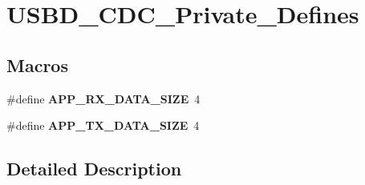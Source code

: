 \hypertarget{group___u_s_b_d___c_d_c___private___defines}{}\section{U\+S\+B\+D\+\_\+\+C\+D\+C\+\_\+\+Private\+\_\+\+Defines}
\label{group___u_s_b_d___c_d_c___private___defines}
\subsection*{Macros}
\begin{DoxyCompactItemize}
\item 
\hypertarget{group___u_s_b_d___c_d_c___private___defines_gaf3db03a3d03a80e1ec7a0a9c470d9692}{}\label{group___u_s_b_d___c_d_c___private___defines_gaf3db03a3d03a80e1ec7a0a9c470d9692} 
\#define {\bfseries A\+P\+P\+\_\+\+R\+X\+\_\+\+D\+A\+T\+A\+\_\+\+S\+I\+ZE}~4
\item 
\hypertarget{group___u_s_b_d___c_d_c___private___defines_gaff35924b436331d533599db9489c79ee}{}\label{group___u_s_b_d___c_d_c___private___defines_gaff35924b436331d533599db9489c79ee} 
\#define {\bfseries A\+P\+P\+\_\+\+T\+X\+\_\+\+D\+A\+T\+A\+\_\+\+S\+I\+ZE}~4
\end{DoxyCompactItemize}


\subsection{Detailed Description}
